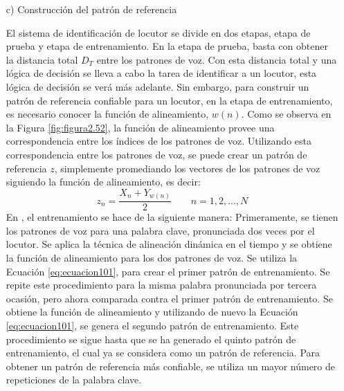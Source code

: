 \begin{enumerate}
\vskip 0.5cm
\item[c)]Construcción del patrón de referencia
\par
El sistema de identificación de locutor se divide en dos etapas, etapa de prueba y etapa de entrenamiento. En la etapa de prueba, basta con obtener la distancia total $D_{T}$ entre los patrones de voz. Con esta distancia total y una lógica de decisión se lleva a cabo la tarea de identificar a un locutor, esta lógica de decisión se verá más adelante. Sin embargo, para construir un patrón de referencia confiable para un locutor, en la etapa de entrenamiento, es necesario conocer la función de alineamiento, $w(n)$. Como se observa en la Figura \ref{fig:figura2.52}, la función de alineamiento provee una correspondencia entre los índices de los patrones de voz. Utilizando esta correspondencia entre los patrones de voz, se puede crear un patrón de referencia $z$, simplemente promediando los vectores de los patrones de voz siguiendo la función de alineamiento, es decir:
\begin{equation}
\label{eq:ecuacion101}
z_{n} = \frac{X_{n} + Y_{w(n)}}{2}
\qquad
n=1,2,...,N
\end{equation}
En \citep{furui}, el entrenamiento se hace de la siguiente manera: Primeramente, se tienen los patrones de voz para una palabra clave, pronunciada dos veces por el locutor. Se aplica la técnica de alineación dinámica en el tiempo y se obtiene la función de alineamiento para los dos patrones de voz.
\vskip 0.5cm
Se utiliza la Ecuación \eqref{eq:ecuacion101}, para crear el primer patrón de entrenamiento. Se repite este procedimiento para la misma palabra pronunciada por tercera ocasión, pero ahora comparada contra el primer patrón de entrenamiento. Se obtiene la función de alineamiento y utilizando de nuevo la Ecuación \eqref{eq:ecuacion101}, se genera el segundo patrón de entrenamiento. Este procedimiento se sigue hasta que se ha generado el quinto patrón de entrenamiento, el cual ya se considera como un patrón de referencia. Para obtener un patrón de referencia más confiable, se utiliza un mayor número de repeticiones de la palabra clave.


\end{enumerate}

